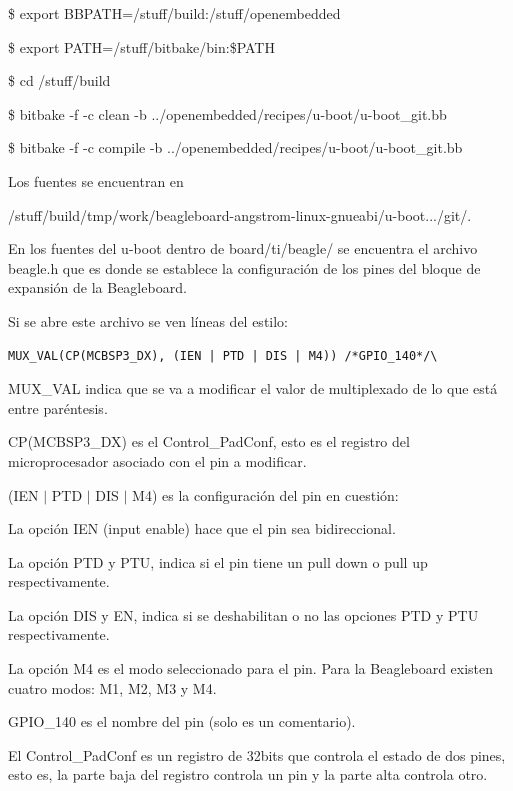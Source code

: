 \bigskip
{}

\bigskip
\centerline{\$ export BBPATH=/stuff/build:/stuff/openembedded}

\centerline{\$ export PATH=/stuff/bitbake/bin:\$PATH}

\bigskip
{}

\centerline{\$ cd /stuff/build}

\centerline{\$ bitbake -f -c clean -b ../openembedded/recipes/u-boot/u-boot\_git.bb}

\centerline{\$ bitbake -f -c compile -b ../openembedded/recipes/u-boot/u-boot\_git.bb}

\bigskip
Los fuentes se encuentran en 

/stuff/build/tmp/work/beagleboard-angstrom-linux-gnueabi/u-boot.../git/.

\bigskip
En los fuentes del u-boot dentro de board/ti/beagle/ se encuentra el archivo beagle.h que es donde se establece la configuración de los pines del bloque de expansión de la Beagleboard.

Si se abre este archivo se ven líneas del estilo: 

\begin{verbatim}
MUX_VAL(CP(MCBSP3_DX), (IEN | PTD | DIS | M4)) /*GPIO_140*/\
\end{verbatim}

MUX\_VAL indica que se va a modificar el valor de multiplexado de lo que está entre paréntesis. 

\bigskip
CP(MCBSP3\_DX) es el Control\_PadConf, esto es el registro del microprocesador asociado con el 
pin a modificar. 

\bigskip
(IEN $|$ PTD $|$ DIS $|$ M4) es la configuración del pin en cuestión: 


La opción IEN (input enable) hace que el pin sea bidireccional. 

La opción PTD y PTU, indica si el pin tiene un pull down o pull up respectivamente. 

La opción DIS y EN, indica si se deshabilitan o no las opciones PTD y PTU respectivamente. 

La opción M4 es el modo seleccionado para el pin. Para la Beagleboard existen cuatro modos: M1, M2, M3 y M4.

\bigskip
GPIO\_140 es el nombre del pin (solo es un comentario). 

\bigskip
El Control\_PadConf es un registro de 32bits que controla el estado de dos pines, esto es, la parte 
baja del registro controla un pin y la parte alta controla otro. 

